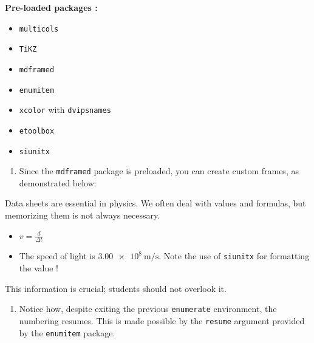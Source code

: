 \documentclass[12pt,code]{HSP-Test}
\begin{document}
\begin{doc}
		\textbf{Pre-loaded packages :}
		\vspace{-\baselineskip}
		\begin{multicols*}{2}
			\begin{itemize}
				\item \texttt{multicols}
				\item \texttt{TiKZ}
				\item \texttt{mdframed}
				\item \texttt{enumitem}
				\item \texttt{xcolor} with \texttt{dvipsnames}
				\item \texttt{etoolbox}
				\item \texttt{siunitx}
			\end{itemize}
		\end{multicols*}
	\end{doc}
	
	\begin{enumerate}[label=\bfseries\arabic*.]
		\item Since the \texttt{mdframed} package is preloaded, you can create custom frames, as demonstrated below:
	\end{enumerate}
	
	\begin{mdframed}[frametitle={\colorbox{white}{\space Data sheet\space}},
					 frametitleaboveskip=-\ht\strutbox]
		Data sheets are essential in physics. We often deal with values and formulas, but memorizing them is not always necessary.
		\begin{itemize}
			\item $v = \frac{d}{\Delta t}$
			\item The speed of light is $\SI{3.00e8}{\meter\per\second}$. Note the use of \texttt{siunitx} for formatting the value !
		\end{itemize}
	\end{mdframed}
	
	\begin{mdframed}[frametitle={\colorbox{cPrim!10}{\space Warning ! \space}},
					 frametitleaboveskip=-\ht\strutbox,
					 backgroundcolor=cPrim!10,
					 linecolor=cPrim,
					 ]
		This information is crucial; students should not overlook it.
	\end{mdframed}
	
	\begin{enumerate}[resume,label=\bfseries\arabic*.]
		\item Notice how, despite exiting the previous \texttt{enumerate} environment, the numbering resumes. This is made possible by the \texttt{resume} argument provided by the \texttt{enumitem} package.
	\end{enumerate}
\end{document}
